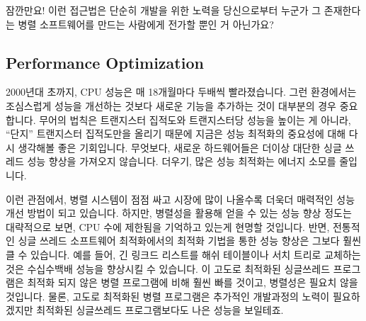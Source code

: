 \QuickQuiz{}
	잠깐만요!
	이런 접근법은 단순히 개발을 위한 노력을 당신으로부터 누군가 그
	존재한다는 병렬 소프트웨어를 만드는 사람에게 전가할 뿐인 거 아닌가요?
 \QuickQuizEnd

\subsection{Performance Optimization}
\label{sec:intro:Performance Optimization}

2000년대 초까지, CPU 성능은 매 18개월마다 두배씩 빨라졌습니다.
그런 환경에서는 조심스럽게 성능을 개선하는 것보다 새로운 기능을 추가하는 것이
대부분의 경우 중요합니다.
무어의 법칙은 트랜지스터 집적도와 트랜지스터당 성능을 높이는 게 아니라,
``단지'' 트랜지스터 집적도만을 올리기 때문에 지금은 성능 최적화의 중요성에 대해
다시 생각해볼 좋은 기회입니다.
무엇보다, 새로운 하드웨어들은 더이상 대단한 싱글 쓰레드 성능 향상을 가져오지
않습니다.
더우기, 많은 성능 최적화는 에너지 소모를 줄입니다.


이런 관점에서, 병렬 시스템이 점점 싸고 시장에 많이 나올수록 더욱더 매력적인
성능 개선 방법이 되고 있습니다.
하지만, 병렬성을 활용해 얻을 수 있는 성능 향상 정도는 대략적으로 보면, CPU 수에
제한됨을 기억하고 있는게 현명할 것입니다.
반면, 전통적인 싱글 쓰레드 소프트웨어 최적화에서의 최적화 기법을 통한 성능
향상은 그보다 훨씬 클 수 있습니다.
예를 들어, 긴 링크드 리스트를 해쉬 테이블이나 서치 트리로 교체하는 것은
수십수백배 성능을 향상시킬 수 있습니다.
이 고도로 최적화된 싱글쓰레드 프로그램은 최적화 되지 않은 병렬 프로그램에 비해
훨씬 빠를 것이고, 병렬성은 필요치 않을 것입니다.
물론, 고도로 최적화된 병렬 프로그램은 추가적인 개발과정의 노력이 필요하겠지만
최적화된 싱글쓰레드 프로그램보다도 나은 성능을 보일테죠.

